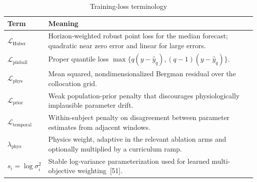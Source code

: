 \documentclass[10pt]{article}
\begin{document}
\begin{table}[h!]
\centering
\caption{Training-loss terminology}
\label{tab:loss}
\footnotesize
\begin{tabular}{lp{13cm}}
\toprule
Term & Meaning \\
\midrule
$\mathcal{L}_{\text{Huber}}$ & Horizon-weighted robust point loss for the median forecast; quadratic near zero error and linear for large errors. \\
$\mathcal{L}_{\text{pinball}}$ & Proper quantile loss $\max\{q(y-\hat{y}_q), (q-1)(y-\hat{y}_q)\}$. \\
$\mathcal{L}_{\text{phys}}$ & Mean squared, nondimensionalized Bergman residual over the collocation grid. \\
$\mathcal{L}_{\text{prior}}$ & Weak population-prior penalty that discourages physiologically implausible parameter drift. \\
$\mathcal{L}_{\text{temporal}}$ & Within-subject penalty on disagreement between parameter estimates from adjacent windows. \\
$\lambda_{\text{phys}}$ & Physics weight, adaptive in the relevant ablation arms and optionally multiplied by a curriculum ramp. \\
$s_i = \log\sigma_i^2$ & Stable log-variance parameterization used for learned multi-objective weighting~[51]. \\
\bottomrule
\end{tabular}
\end{table}
\end{document}
